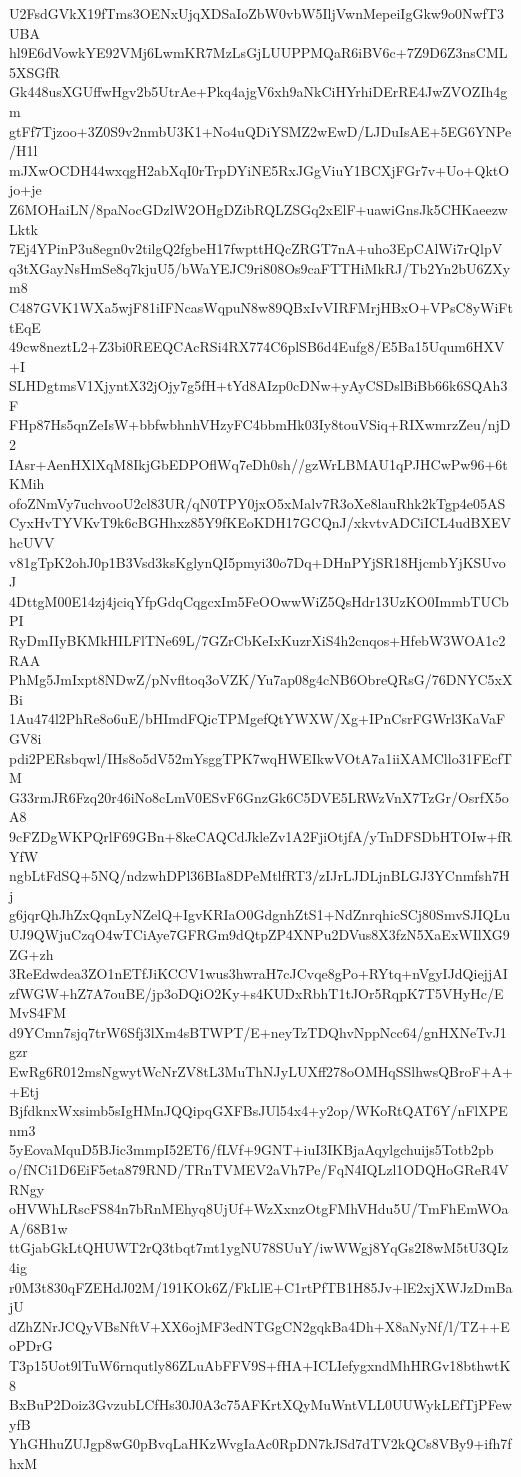 U2FsdGVkX19fTms3OENxUjqXDSaIoZbW0vbW5IljVwnMepeiIgGkw9o0NwfT3UBA
hl9E6dVowkYE92VMj6LwmKR7MzLsGjLUUPPMQaR6iBV6c+7Z9D6Z3nsCML5XSGfR
Gk448usXGUffwHgv2b5UtrAe+Pkq4ajgV6xh9aNkCiHYrhiDErRE4JwZVOZIh4gm
gtFf7Tjzoo+3Z0S9v2nmbU3K1+No4uQDiYSMZ2wEwD/LJDuIsAE+5EG6YNPe/H1l
mJXwOCDH44wxqgH2abXqI0rTrpDYiNE5RxJGgViuY1BCXjFGr7v+Uo+QktOjo+je
Z6MOHaiLN/8paNocGDzlW2OHgDZibRQLZSGq2xElF+uawiGnsJk5CHKaeezwLktk
7Ej4YPinP3u8egn0v2tilgQ2fgbeH17fwpttHQcZRGT7nA+uho3EpCAlWi7rQlpV
q3tXGayNsHmSe8q7kjuU5/bWaYEJC9ri808Os9caFTTHiMkRJ/Tb2Yn2bU6ZXym8
C487GVK1WXa5wjF81iIFNcasWqpuN8w89QBxIvVIRFMrjHBxO+VPsC8yWiFttEqE
49cw8neztL2+Z3bi0REEQCAcRSi4RX774C6plSB6d4Eufg8/E5Ba15Uqum6HXV+I
SLHDgtmsV1XjyntX32jOjy7g5fH+tYd8AIzp0cDNw+yAyCSDslBiBb66k6SQAh3F
FHp87Hs5qnZeIsW+bbfwbhnhVHzyFC4bbmHk03Iy8touVSiq+RIXwmrzZeu/njD2
IAsr+AenHXlXqM8IkjGbEDPOflWq7eDh0sh//gzWrLBMAU1qPJHCwPw96+6tKMih
ofoZNmVy7uchvooU2cl83UR/qN0TPY0jxO5xMalv7R3oXe8lauRhk2kTgp4e05AS
CyxHvTYVKvT9k6cBGHhxz85Y9fKEoKDH17GCQnJ/xkvtvADCiICL4udBXEVhcUVV
v81gTpK2ohJ0p1B3Vsd3ksKglynQI5pmyi30o7Dq+DHnPYjSR18HjcmbYjKSUvoJ
4DttgM00E14zj4jciqYfpGdqCqgcxIm5FeOOwwWiZ5QsHdr13UzKO0ImmbTUCbPI
RyDmIIyBKMkHILFlTNe69L/7GZrCbKeIxKuzrXiS4h2cnqos+HfebW3WOA1c2RAA
PhMg5JmIxpt8NDwZ/pNvfltoq3oVZK/Yu7ap08g4cNB6ObreQRsG/76DNYC5xXBi
1Au474l2PhRe8o6uE/bHImdFQicTPMgefQtYWXW/Xg+IPnCsrFGWrl3KaVaFGV8i
pdi2PERsbqwl/IHs8o5dV52mYsggTPK7wqHWEIkwVOtA7a1iiXAMCllo31FEcfTM
G33rmJR6Fzq20r46iNo8cLmV0ESvF6GnzGk6C5DVE5LRWzVnX7TzGr/OsrfX5oA8
9cFZDgWKPQrlF69GBn+8keCAQCdJkleZv1A2FjiOtjfA/yTnDFSDbHTOIw+fRYfW
ngbLtFdSQ+5NQ/ndzwhDPl36BIa8DPeMtlfRT3/zIJrLJDLjnBLGJ3YCnmfsh7Hj
g6jqrQhJhZxQqnLyNZelQ+IgvKRIaO0GdgnhZtS1+NdZnrqhicSCj80SmvSJIQLu
UJ9QWjuCzqO4wTCiAye7GFRGm9dQtpZP4XNPu2DVus8X3fzN5XaExWIlXG9ZG+zh
3ReEdwdea3ZO1nETfJiKCCV1wus3hwraH7cJCvqe8gPo+RYtq+nVgyIJdQiejjAI
zfWGW+hZ7A7ouBE/jp3oDQiO2Ky+s4KUDxRbhT1tJOr5RqpK7T5VHyHc/EMvS4FM
d9YCmn7sjq7trW6Sfj3lXm4sBTWPT/E+neyTzTDQhvNppNcc64/gnHXNeTvJ1gzr
EwRg6R012msNgwytWcNrZV8tL3MuThNJyLUXff278oOMHqSSlhwsQBroF+A++Etj
BjfdknxWxsimb5sIgHMnJQQipqGXFBsJUl54x4+y2op/WKoRtQAT6Y/nFlXPEnm3
5yEovaMquD5BJic3mmpI52ET6/fLVf+9GNT+iuI3IKBjaAqylgchuijs5Totb2pb
o/fNCi1D6EiF5eta879RND/TRnTVMEV2aVh7Pe/FqN4IQLzl1ODQHoGReR4VRNgy
oHVWhLRscFS84n7bRnMEhyq8UjUf+WzXxnzOtgFMhVHdu5U/TmFhEmWOaA/68B1w
ttGjabGkLtQHUWT2rQ3tbqt7mt1ygNU78SUuY/iwWWgj8YqGs2I8wM5tU3QIz4ig
r0M3t830qFZEHdJ02M/191KOk6Z/FkLlE+C1rtPfTB1H85Jv+lE2xjXWJzDmBajU
dZhZNrJCQyVBsNftV+XX6ojMF3edNTGgCN2gqkBa4Dh+X8aNyNf/l/TZ++EoPDrG
T3p15Uot9lTuW6rnqutly86ZLuAbFFV9S+fHA+ICLIefygxndMhHRGv18bthwtK8
BxBuP2Doiz3GvzubLCfHs30J0A3c75AFKrtXQyMuWntVLL0UUWykLEfTjPFewyfB
YhGHhuZUJgp8wG0pBvqLaHKzWvgIaAc0RpDN7kJSd7dTV2kQCs8VBy9+ifh7fhxM
